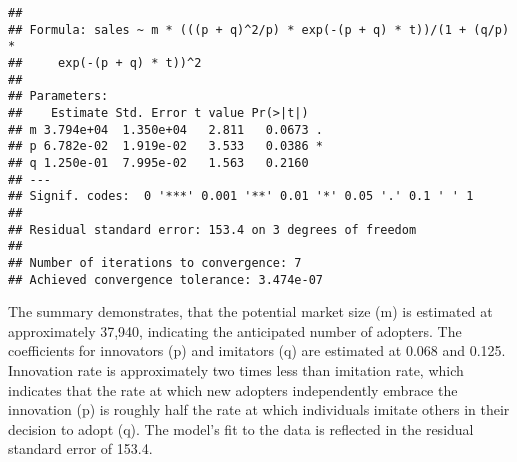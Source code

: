 \documentclass[
]{article}
\newenvironment{Shaded}{\begin{snugshade}}{\end{snugshade}}
\newcommand{\AttributeTok}[1]{\textcolor[rgb]{0.13,0.29,0.53}{#1}}
\newcommand{\DecValTok}[1]{\textcolor[rgb]{0.00,0.00,0.81}{#1}}
\newcommand{\FloatTok}[1]{\textcolor[rgb]{0.00,0.00,0.81}{#1}}
\newcommand{\FunctionTok}[1]{\textcolor[rgb]{0.13,0.29,0.53}{\textbf{#1}}}
\newcommand{\NormalTok}[1]{#1}
\newcommand{\OtherTok}[1]{\textcolor[rgb]{0.56,0.35,0.01}{#1}}
\newcommand{\SpecialCharTok}[1]{\textcolor[rgb]{0.81,0.36,0.00}{\textbf{#1}}}
\begin{document}
\begin{Shaded}
\end{Shaded}

\begin{verbatim}
## 
## Formula: sales ~ m * (((p + q)^2/p) * exp(-(p + q) * t))/(1 + (q/p) * 
##     exp(-(p + q) * t))^2
## 
## Parameters:
##    Estimate Std. Error t value Pr(>|t|)  
## m 3.794e+04  1.350e+04   2.811   0.0673 .
## p 6.782e-02  1.919e-02   3.533   0.0386 *
## q 1.250e-01  7.995e-02   1.563   0.2160  
## ---
## Signif. codes:  0 '***' 0.001 '**' 0.01 '*' 0.05 '.' 0.1 ' ' 1
## 
## Residual standard error: 153.4 on 3 degrees of freedom
## 
## Number of iterations to convergence: 7 
## Achieved convergence tolerance: 3.474e-07
\end{verbatim}

The summary demonstrates, that the potential market size (m) is
estimated at approximately 37,940, indicating the anticipated number of
adopters. The coefficients for innovators (p) and imitators (q) are
estimated at 0.068 and 0.125. Innovation rate is approximately two times
less than imitation rate, which indicates that the rate at which new
adopters independently embrace the innovation (p) is roughly half the
rate at which individuals imitate others in their decision to adopt (q).
The model's fit to the data is reflected in the residual standard error
of 153.4.
\end{document}
